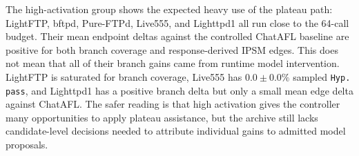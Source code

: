 \documentclass[final,5p,times,number]{elsarticle}
\begin{document}
\begin{table}[!t]
\centering
\caption{Plateau-activation strata}
\label{tab:plateau_activation_strata}
{\scriptsize
\setlength{\tabcolsep}{2.9pt}
\renewcommand{\arraystretch}{0.95}
}
\end{table}

The high-activation group shows the expected heavy use of the plateau path: LightFTP, bftpd, Pure-FTPd, Live555, and Lighttpd1 all run close to the 64-call budget. Their mean endpoint deltas against the controlled ChatAFL baseline are positive for both branch coverage and response-derived IPSM edges. This does not mean that all of their branch gains came from runtime model intervention. LightFTP is saturated for branch coverage, Live555 has $0.0{\pm}0.0\%$ sampled \texttt{Hyp. pass}, and Lighttpd1 has a positive branch delta but only a small mean edge delta against ChatAFL. The safer reading is that high activation gives the controller many opportunities to apply plateau assistance, but the archive still lacks candidate-level decisions needed to attribute individual gains to admitted model proposals.
\end{document}
